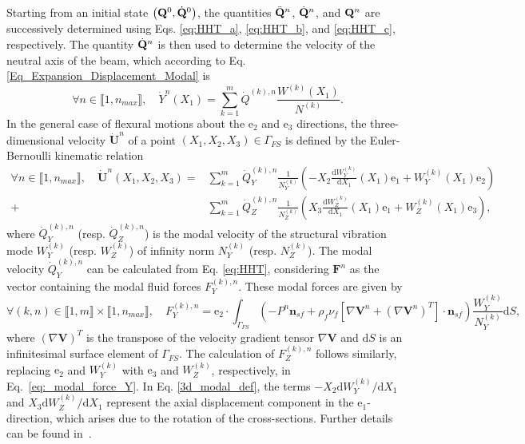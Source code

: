 Starting from an initial state \(\left({\mathbf{Q}}^{0},\dot{\mathbf{Q}}^{0}\right)\), the quantities \(\ddot{\mathbf{Q}}^{n}\), \(\dot{\mathbf{Q}}^{n}\), and \({\mathbf{Q}}^{n}\) are successively determined using Eqs. \eqref{eq:HHT_a}, \eqref{eq:HHT_b}, and \eqref{eq:HHT_c}, respectively.  
The quantity \(\dot{\mathbf{Q}}^{n}\) is then used to determine the velocity of the neutral axis of the beam, which according to Eq. \eqref{Eq_Expansion_Displacement_Modal} is
\begin{equation}
    \forall n\in\llbracket 1,n_{max}\rrbracket,\quad \dot{Y}^{n} (X_1)=\sum_{k=1}^m \dot{Q}^{(k), n}  \frac{W^{(k)} (X_1)}{N^{(k)}}.
\end{equation}
In the general case of flexural motions about the \(\boldsymbol{\mathrm{e}}_{2}\) and \(\boldsymbol{\mathrm{e}}_{3}\) directions, the three-dimensional velocity \(\dot{\mathbf{U}}^{n}\) of a point \((X_1, X_2, X_3)\in\Gamma_{FS}\) is defined by the Euler-Bernoulli kinematic relation
\begin{align}\label{3d_modal_def}
    \forall n\in\llbracket 1,n_{max}\rrbracket,\quad \dot{\mathbf{U}}^{n}(X_1, X_2, X_3) = &\sum_{k=1}^{m} \dot{Q}^{(k),n}_Y \frac{1}{N_{Y}^{(k)}}\left(- X_2 \frac{{\textrm{d}} W_Y^{(k)}}{{\textrm{d}} X_1}(X_1) \boldsymbol{\mathrm{e}}_{1} +  W_Y^{(k)}(X_1) \boldsymbol{\mathrm{e}}_{2} \right)\nonumber\\
+ &\sum_{k=1}^{m} \dot{Q}^{(k),n}_Z \frac{1}{N_{Z}^{(k)}}\left( X_3 \frac{{\textrm{d}} W_Z^{(k)}}{{\textrm{d}} X_1}(X_1) \boldsymbol{\mathrm{e}}_{1} +  W_Z^{(k)}(X_1) \boldsymbol{\mathrm{e}}_{3} \right),
\end{align}
where $\dot{Q}^{(k),n}_Y$ (resp. $\dot{Q}^{(k),n}_Z$) is the modal velocity of the structural vibration mode $W_Y^{(k)}$ (resp. $W_Z^{(k)}$) of infinity norm $N_Y^{(k)}$ (resp. $N_Z^{(k)}$). The modal velocity $\dot{Q}^{(k),n}_Y$ can be calculated from Eq. \eqref{eq:HHT}, considering ${\mathbf{F}}^{n}$ as the vector containing the modal fluid forces $F^{(k),n}_Y$. These modal forces are given by    
\begin{equation}
      \forall \left(k,n\right)\in\llbracket 1,m\rrbracket\times\llbracket 1,n_{max}\rrbracket,\quad    F^{(k),n}_Y= \boldsymbol{\mathrm{e}}_2\cdot\int_{\Gamma_{FS}} \left(-P^n \mathbf{n}_{sf}  +\rho_f \nu_f  \left[\nabla {{\mathbf{V}}^n} +\left(\nabla {{\mathbf{V}}^n} \right)^{T} \right]\cdot \mathbf{n}_{sf} \right) \frac{{W}^{(k)}_Y}{{N_{Y}^{(k)}}}{\textrm{d}}S,
     \label{eq:_modal_force_Y}
    \end{equation}
where $\left(\nabla{{\mathbf{V}}} \right)^{T}$ is the transpose of the velocity gradient tensor $\nabla{{\mathbf{V}}}$ and ${\textrm{d}}S$ is an infinitesimal surface element of $\Gamma_{FS}$. 
 The calculation of \( F^{(k),n}_Z \) follows similarly, replacing \( \boldsymbol{\mathrm{e}}_2 \) and \( W_Y^{(k)} \) with \( \boldsymbol{\mathrm{e}}_3 \) and \( W_Z^{(k)} \), respectively, in Eq.~\eqref{eq:_modal_force_Y}.
In Eq. \eqref{3d_modal_def}, the terms \(- X_2 {{\textrm{d}} W_Y^{(k)}}/{{\textrm{d}} X_1}\) and  \(X_3 {{\textrm{d}} W_Z^{(k)}}/{{\textrm{d}} X_1}\) represent the axial displacement component in the \(\boldsymbol{\mathrm{e}}_1\)-direction, which arises due to the rotation of the cross-sections. Further details can be found in~\cite{lagrange2025fluid}.


